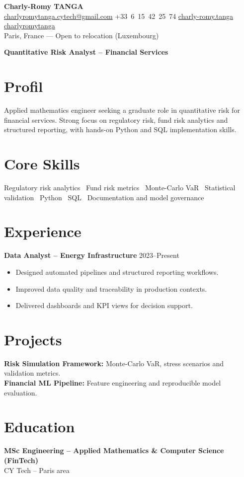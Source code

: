 \documentclass[10pt, letterpaper]{article}
\begin{document}
\begin{center}
\textbf{\LARGE Charly-Romy TANGA}\\[0.15cm]
\mbox{\href{mailto:charlyromytanga.cytech@gmail.com}{\footnotesize\faEnvelope\hspace*{0.1cm}charlyromytanga.cytech@gmail.com}}\kern0.25cm
\mbox{\faPhone\hspace*{0.1cm}+33 6 15 42 25 74}\kern0.25cm
\mbox{\href{https://www.linkedin.com/in/charly-romy-tanga}{\footnotesize\faLinkedin\hspace*{0.1cm}charly-romy.tanga}}\kern0.25cm
\mbox{\href{https://github.com/charlyromytanga}{\footnotesize\faGithub\hspace*{0.1cm}charlyromytanga}}\\[0.15cm]
Paris, France --- Open to relocation (Luxembourg)
\end{center}
\textbf{Quantitative Risk Analyst -- Financial Services}
\section*{Profil}
Applied mathematics engineer seeking a graduate role in quantitative risk for financial services. Strong focus on regulatory risk, fund risk analytics and structured reporting, with hands-on Python and SQL implementation skills.
\section*{Core Skills}
Regulatory risk analytics \textbullet\ Fund risk metrics \textbullet\ Monte-Carlo VaR \textbullet\ Statistical validation \textbullet\ Python \textbullet\ SQL \textbullet\ Documentation and model governance
\section*{Experience}
\textbf{Data Analyst -- Energy Infrastructure} \hfill 2023--Present
\begin{itemize}[leftmargin=0.45cm,itemsep=1pt,topsep=2pt]
\item Designed automated pipelines and structured reporting workflows.
\item Improved data quality and traceability in production contexts.
\item Delivered dashboards and KPI views for decision support.
\end{itemize}
\section*{Projects}
\textbf{Risk Simulation Framework:} Monte-Carlo VaR, stress scenarios and validation metrics.\\
\textbf{Financial ML Pipeline:} Feature engineering and reproducible model evaluation.
\section*{Education}
\textbf{MSc Engineering -- Applied Mathematics \& Computer Science (FinTech)}\\CY Tech -- Paris area
\end{document}
